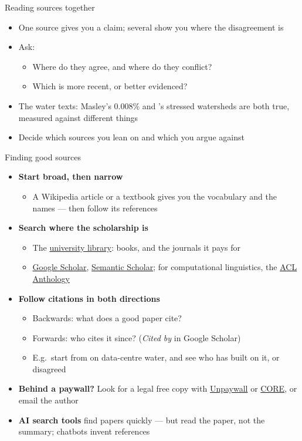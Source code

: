 \documentclass[aspectratio=169]{beamer}
\begin{document}
\begin{frame}{Reading sources together}
\begin{itemize}
  \item One source gives you a claim; several show you where the disagreement is
  \item Ask:
    \begin{itemize}
      \item Where do they agree, and where do they conflict?
      \item Which is more recent, or better evidenced?
    \end{itemize}
  \item The water texts: Masley's 0.008\% and \citet{Mytton2021}'s stressed
    watersheds are both true, measured against different things
  \item Decide which sources you lean on and which you argue against
\end{itemize}
\end{frame}

\begin{frame}{Finding good sources}
\small
\begin{itemize}
  \item \textbf{Start broad, then narrow}
    \begin{itemize}
    \item A Wikipedia article or a textbook gives you the vocabulary and the
      names --- then follow its references
    \end{itemize}
  \item \textbf{Search where the scholarship is}
    \begin{itemize}
    \item The \href{https://knihovna.upol.cz/}{university library}: books, and
      the journals it pays for
    \item \href{https://scholar.google.com/}{Google Scholar},
      \href{https://www.semanticscholar.org/}{Semantic Scholar}; for
      computational linguistics, the \href{https://aclanthology.org/}{ACL Anthology}
    \end{itemize}
  \item \textbf{Follow citations in both directions}
    \begin{itemize}
    \item Backwards: what does a good paper cite?
    \item Forwards: who cites it since?  (\emph{Cited by} in Google Scholar)
    \item E.g.\ start from \citet{Mytton2021} on data-centre water, and see who
      has built on it, or disagreed
    \end{itemize}
  \item \textbf{Behind a paywall?}  Look for a legal free copy with
    \href{https://unpaywall.org/}{Unpaywall} or \href{https://core.ac.uk/}{CORE},
    or email the author
  \item \textbf{AI search tools} find papers quickly --- but read the paper,
    not the summary; chatbots invent references
\end{itemize}
\end{frame}
\end{document}
